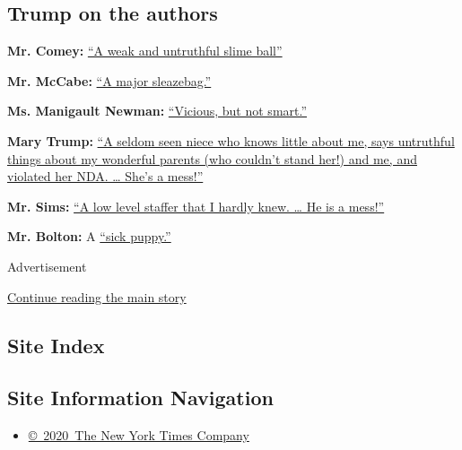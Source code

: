 \hypertarget{trump-on-the-authors}{%
\subsection{Trump on the authors}\label{trump-on-the-authors}}

\textbf{Mr. Comey:}
\href{https://www.businessinsider.com/trump-tweets-james-comey-book-higher-loyalty-slime-ball-2018-4}{``A
weak and untruthful slime ball''}

\textbf{Mr. McCabe:}
\href{https://twitter.com/realdonaldtrump/status/1150011125347627009?lang=en}{``A
major sleazebag.''}

\textbf{Ms. Manigault Newman:}
\href{https://www.cnbc.com/2018/08/13/trump-launches-twitter-attack-on-omarosa-she-was-vicious-but-not-smart.html}{``Vicious,
but not smart.''}

\textbf{Mary Trump:}
\href{https://twitter.com/realdonaldtrump/status/1284255473424891905}{``A
seldom seen niece who knows little about me, says untruthful things
about my wonderful parents (who couldn't stand her!) and me, and
violated her NDA. \ldots{} She's a mess!''}

\textbf{Mr. Sims:}
\href{https://twitter.com/realdonaldtrump/status/1090244651578204160?lang=en}{``A
low level staffer that I hardly knew. \ldots{} He is a mess!''}

\textbf{Mr. Bolton:} A
\href{https://twitter.com/realdonaldtrump/status/1273603410340843520}{``sick
puppy.''}

Advertisement

\protect\hyperlink{after-bottom}{Continue reading the main story}

\hypertarget{site-index}{%
\subsection{Site Index}\label{site-index}}

\hypertarget{site-information-navigation}{%
\subsection{Site Information
Navigation}\label{site-information-navigation}}

\begin{itemize}
\tightlist
\item
  \href{https://help.nytimes.com/hc/en-us/articles/115014792127-Copyright-notice}{©~2020~The
  New York Times Company}
\end{itemize}

